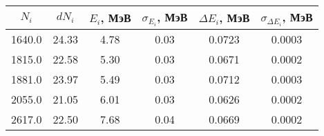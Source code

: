 \begin{tabular}{cccccc}
\toprule
$N_i$ & $dN_i$ & $E_i$, МэВ & $\sigma_{E_i}$, МэВ & $\Delta E_i$, МэВ & $\sigma_{\Delta E_i}$, МэВ \\
\midrule
1640.0 & 24.33 & 4.78 & 0.03 & 0.0723 & 0.0003 \\
1815.0 & 22.58 & 5.30 & 0.03 & 0.0671 & 0.0002 \\
1881.0 & 23.97 & 5.49 & 0.03 & 0.0712 & 0.0003 \\
2055.0 & 21.05 & 6.01 & 0.03 & 0.0626 & 0.0002 \\
2617.0 & 22.50 & 7.68 & 0.04 & 0.0669 & 0.0002 \\
\bottomrule
\end{tabular}

